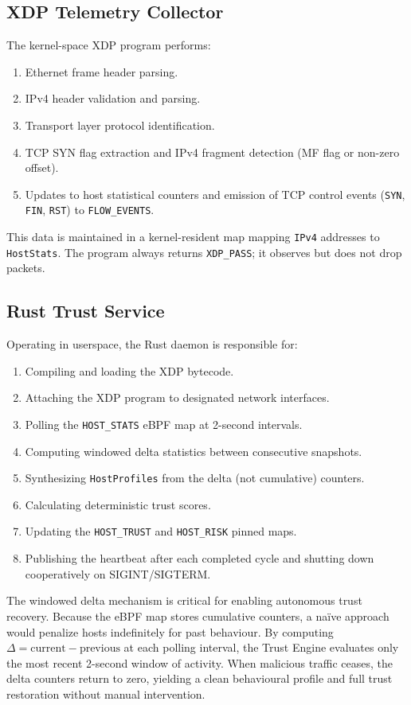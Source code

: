 \documentclass[conference]{IEEEtran}
\begin{document}
\subsection{XDP Telemetry Collector}
The kernel-space XDP program performs:
\begin{enumerate}
\item Ethernet frame header parsing.
\item IPv4 header validation and parsing.
\item Transport layer protocol identification.
\item TCP SYN flag extraction and IPv4 fragment detection (MF flag or non-zero offset).
\item Updates to host statistical counters and emission of TCP control events (\texttt{SYN}, \texttt{FIN}, \texttt{RST}) to \texttt{FLOW\_EVENTS}.
\end{enumerate}
This data is maintained in a kernel-resident map mapping \texttt{IPv4} addresses to \texttt{HostStats}. The program always returns \texttt{XDP\_PASS}; it observes but does not drop packets.

\subsection{Rust Trust Service}
Operating in userspace, the Rust daemon is responsible for:
\begin{enumerate}
\item Compiling and loading the XDP bytecode.
\item Attaching the XDP program to designated network interfaces.
\item Polling the \texttt{HOST\_STATS} eBPF map at 2-second intervals.
\item Computing windowed delta statistics between consecutive snapshots.
\item Synthesizing \texttt{HostProfiles} from the delta (not cumulative) counters.
\item Calculating deterministic trust scores.
\item Updating the \texttt{HOST\_TRUST} and \texttt{HOST\_RISK} pinned maps.
\item Publishing the heartbeat after each completed cycle and shutting down cooperatively on SIGINT/SIGTERM.
\end{enumerate}

The windowed delta mechanism is critical for enabling autonomous trust recovery. Because the eBPF map stores cumulative counters, a na\"ive approach would penalize hosts indefinitely for past behaviour. By computing $\Delta = \text{current} - \text{previous}$ at each polling interval, the Trust Engine evaluates only the most recent 2-second window of activity. When malicious traffic ceases, the delta counters return to zero, yielding a clean behavioural profile and full trust restoration without manual intervention.
\end{document}
